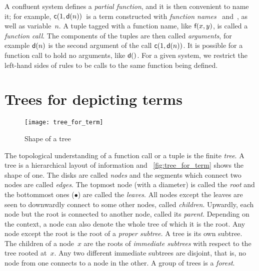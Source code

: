 A confluent system defines a \emph{partial function}, and it is then
convenient to name it; for example, \(\textsf{c}(1, \textsf{d}(n))\)~is a
term constructed with \emph{function names} ~and~, as
well as variable~\(n\). A tuple tagged with a function name, like
\(\textsf{f}(x,y)\), is called a \emph{function call}. The components of
the tuples are then called \emph{arguments}, for example
\(\textsf{d}(n)\) is the second argument of the call \(\textsf{c}(1,
\textsf{d}(n))\). It is possible for a function call to hold no
arguments, like \(\textsf{d}()\). For a given system, we restrict the
left\hyp{}hand sides of rules to be calls to the same function being
defined.

\section{Trees for depicting terms}
\label{def:tree}

%
\begin{wrapfigure}[9]{r}[0pt]{0pt}
\centering
\texttt{[image: tree\_for\_term]}%
\caption{Shape of a tree\label{fig:tree_for_term}}
\end{wrapfigure}
The topological understanding of a function call or a tuple is the
finite \emph{tree}. A tree is a hierarchical layout of
information and \fig~\vref{fig:tree_for_term} shows the shape of
one. The disks are called \emph{nodes} and the
segments which connect two nodes are called
\emph{edges}. The topmost node (with a diameter) is
called the \emph{root} and the bottommost ones
(\(\bullet\)) are called the \emph{leaves}. All
nodes except the leaves are seen to downwardly connect to some other
nodes, called \emph{children}. Upwardly, each
node but the root is connected to another node, called its
\emph{parent}. Depending on the context, a
node can also denote the whole tree of which it is the root. Any node
except the root is the root of a \emph{proper
  subtree}. A tree is its own
subtree. The children of a node~\(x\) are the roots of \emph{immediate
  subtrees} with respect to the
tree rooted at~\(x\). Any two different immediate subtrees are
disjoint, that is, no node from one connects to a node in the other. A
group of trees is a \emph{forest}.

